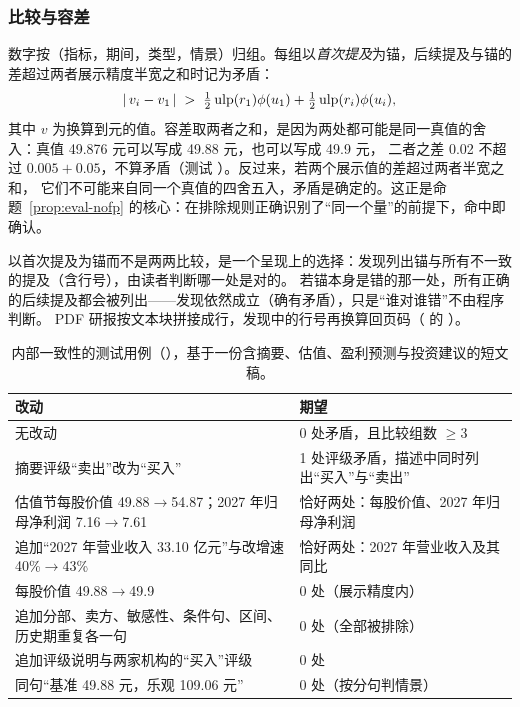 \subsubsection{比较与容差}

数字按（指标，期间，类型，情景）归组。每组以\emph{首次提及}为锚，后续提及与锚的差超过两者展示精度半宽之和时记为矛盾：
\begin{equation}
|\,v_i - v_1\,| \;>\; \tfrac12\operatorname{ulp}(r_1)\phi(u_1) + \tfrac12\operatorname{ulp}(r_i)\phi(u_i),
\label{eq:rc-cons-tol}
\end{equation}
其中 $v$ 为换算到元的值。容差取两者之和，是因为两处都可能是同一真值的舍入：真值 49.876 元可以写成 49.88 元，也可以写成 49.9 元，
二者之差 0.02 不超过 $0.005+0.05$，不算矛盾（测试 ）。反过来，若两个展示值的差超过两者半宽之和，
它们不可能来自同一个真值的四舍五入，矛盾是确定的。这正是命题~\ref{prop:eval-nofp} 的核心：在排除规则正确识别了“同一个量”的前提下，命中即确认。

以首次提及为锚而不是两两比较，是一个呈现上的选择：发现列出锚与所有不一致的提及（含行号），由读者判断哪一处是对的。
若锚本身是错的那一处，所有正确的后续提及都会被列出——发现依然成立（确有矛盾），只是“谁对谁错”不由程序判断。
PDF 研报按文本块拼接成行，发现中的行号再换算回页码（ 的 ）。

\begin{table}[t]
\centering
\caption{内部一致性的测试用例（），基于一份含摘要、估值、盈利预测与投资建议的短文稿。}
\label{tab:rc-cons-tests}
\small
\begin{tabularx}{\linewidth}{@{}p{4.6cm}X@{}}
\toprule
改动 & 期望 \\
\midrule
无改动 & 0 处矛盾，且比较组数 $\ge3$ \\
摘要评级“卖出”改为“买入” & 1 处评级矛盾，描述中同时列出“买入”与“卖出” \\
估值节每股价值 49.88$\to$54.87；2027 年归母净利润 7.16$\to$7.61 & 恰好两处：每股价值、2027 年归母净利润 \\
追加“2027 年营业收入 33.10 亿元”与改增速 40\%$\to$43\% & 恰好两处：2027 年营业收入及其同比 \\
每股价值 49.88$\to$49.9 & 0 处（展示精度内） \\
追加分部、卖方、敏感性、条件句、区间、历史期重复各一句 & 0 处（全部被排除） \\
追加评级说明与两家机构的“买入”评级 & 0 处 \\
同句“基准 49.88 元，乐观 109.06 元” & 0 处（按分句判情景） \\
\bottomrule
\end{tabularx}
\end{table}

